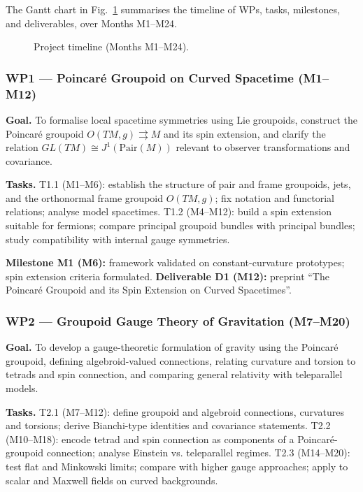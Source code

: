 \documentclass[11pt]{msca-pf}
\begin{document}
The Gantt chart in Fig.~\ref{fig:gantt} summarises the timeline of WPs, tasks, milestones, and deliverables, over Months M1–M24.  

\begin{figure}[htbp]
  \centering
  
  \caption{Project timeline (Months M1–M24).}
  \label{fig:gantt}
\end{figure}


\subsubsection*{WP1 — Poincaré Groupoid on Curved Spacetime (M1–M12)}
\textbf{Goal.} To formalise local spacetime symmetries using Lie groupoids, construct the Poincaré groupoid $O(TM,g)\rightrightarrows M$ and its spin extension, and clarify the relation $GL(TM)\cong J^1(\mathrm{Pair}(M))$ relevant to observer transformations and covariance.  

\textbf{Tasks.}  
T1.1 (M1–M6): establish the structure of pair and frame groupoids, jets, and the orthonormal frame groupoid $O(TM,g)$; fix notation and functorial relations; analyse model spacetimes.  
T1.2 (M4–M12): build a spin extension suitable for fermions; compare principal groupoid bundles with principal bundles; study compatibility with internal gauge symmetries.  

\textbf{Milestone M1 (M6):} framework validated on constant-curvature prototypes; spin extension criteria formulated.  
\textbf{Deliverable D1 (M12):} preprint “The Poincaré Groupoid and its Spin Extension on Curved Spacetimes”.  

\subsubsection*{WP2 — Groupoid Gauge Theory of Gravitation (M7–M20)}
\textbf{Goal.} To develop a gauge-theoretic formulation of gravity using the Poincaré groupoid, defining algebroid-valued connections, relating curvature and torsion to tetrads and spin connection, and comparing general relativity with teleparallel models.  

\textbf{Tasks.}  
T2.1 (M7–M12): define groupoid and algebroid connections, curvatures and torsions; derive Bianchi-type identities and covariance statements.  
T2.2 (M10–M18): encode tetrad and spin connection as components of a Poincaré-groupoid connection; analyse Einstein vs. teleparallel regimes.  
T2.3 (M14–M20): test flat and Minkowski limits; compare with higher gauge approaches; apply to scalar and Maxwell fields on curved backgrounds.  
\end{document}
